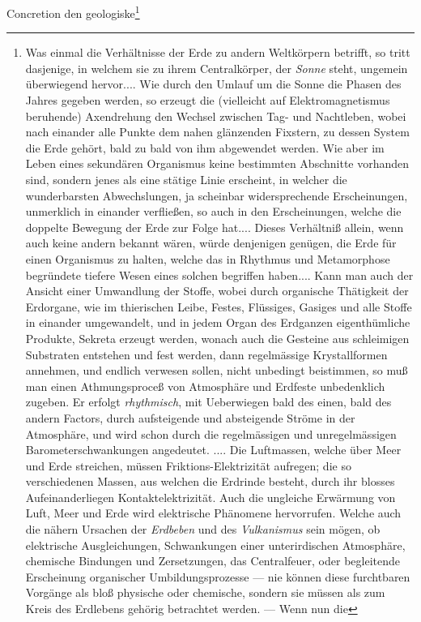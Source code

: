 \documentclass[12pt,a4paper]{book}
\begin{document}
Concretion den geologiske\footnote{Was einmal die Verhältnisse der
Erde zu andern Weltkörpern betrifft, so tritt dasjenige, in welchem
sie zu ihrem Centralkörper, der \emph{Sonne} steht, ungemein überwiegend
hervor.... Wie durch den Umlauf um die Sonne die Phasen des Jahres
gegeben werden, so erzeugt die (vielleicht auf Elektromagnetismus
beruhende) Axendrehung den Wechsel zwischen Tag- und Nachtleben, wobei
nach einander alle Punkte dem nahen glänzenden Fixstern, zu dessen
System die Erde gehört, bald zu bald von ihm abgewendet werden. Wie
aber im Leben eines sekundären Organismus keine bestimmten Abschnitte
vorhanden sind, sondern jenes als eine stätige Linie erscheint, in
welcher die wunderbarsten Abwechslungen, ja scheinbar widersprechende
Erscheinungen, unmerklich in einander verfließen, so auch in den
Erscheinungen, welche die doppelte Bewegung der Erde zur Folge hat....
Dieses Verhältniß allein, wenn auch keine andern bekannt wären, würde
denjenigen genügen, die Erde für einen Organismus zu halten, welche
das in Rhythmus und Metamorphose begründete tiefere Wesen eines
solchen begriffen haben.... Kann man auch der Ansicht einer
Umwandlung der Stoffe, wobei durch organische Thätigkeit der
Erdorgane, wie im thierischen Leibe, Festes, Flüssiges, Gasiges und
alle Stoffe in einander umgewandelt, und in jedem Organ des
Erdganzen eigenthümliche Produkte, Sekreta erzeugt werden, wonach
auch die Gesteine aus schleimigen Substraten entstehen und fest
werden, dann regelmässige Krystallformen annehmen, und endlich
verwesen sollen, nicht unbedingt beistimmen, so muß man einen
Athmungsproceß von Atmosphäre und Erdfeste unbedenklich zugeben. Er
erfolgt \emph{rhythmisch}, mit Ueberwiegen bald des einen, bald des
andern
Factors, durch aufsteigende und absteigende Ströme in der Atmosphäre,
und wird schon durch die regelmässigen und unregelmässigen
Barometerschwankungen angedeutet. .... Die Luftmassen, welche über
Meer und Erde streichen, müssen Friktions-Elektrizität aufregen; die
so verschiedenen Massen, aus welchen die Erdrinde besteht, durch ihr
blosses Aufeinanderliegen Kontaktelektrizität. Auch die ungleiche
Erwärmung von Luft, Meer und Erde wird elektrische Phänomene
hervorrufen. Welche auch die nähern Ursachen der \emph{Erdbeben} und des
\emph{Vulkanismus} sein mögen, ob elektrische Ausgleichungen,
Schwankungen
einer unterirdischen Atmosphäre, chemische Bindungen und
Zersetzungen, das Centralfeuer, oder begleitende Erscheinung
organischer Umbildungsprozesse --- nie können diese furchtbaren
Vorgänge als bloß physische oder chemische, sondern sie müssen als
zum Kreis des Erdlebens gehörig betrachtet werden. --- Wenn nun die
}
\end{document}
